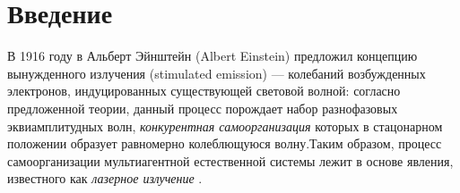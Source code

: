 \chapter{Введение}
\label{chap:Intro}









В 1916 году в \cite{einstein} Альберт Эйнштейн (Albert Einstein) предложил концепцию вынужденного излучения (stimulated emission) --- колебаний возбужденных электронов, индуцированных существующей световой волной: согласно предложенной теории, данный процесс порождает набор разнофазовых эквиамплитудных волн, \emph{конкурентная самоорганизация} которых в стацонарном положении образует равномерно колеблющуюся волну.Таким образом, процесс самоорганизации мультиагентной естественной системы лежит в основе явления, известного как \emph{лазерное излучение} \cite{steen}. 
